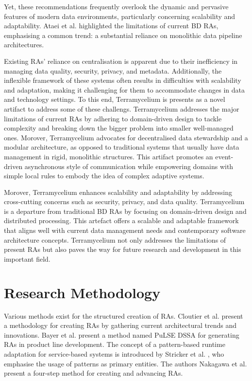 \documentclass[journal]{IEEEtran}
\begin{document}
Yet, these recommendations frequently overlook the dynamic and pervasive features of modern data environments, particularly concerning scalability and adaptability. Ataei et al. \cite{ataei2022state} highlighted the limitations of current BD RAs, emphasising a common trend: a substantial reliance on monolithic data pipeline architectures. 


Existing RAs' reliance on centralisation is apparent due to their inefficiency in managing data quality, security, privacy, and metadata. Additionally, the inflexible framework of these systems often results in difficulties with scalability and adaptation, making it challenging for them to accommodate changes in data and technology settings. To this end, Terramycelium is presents as a novel artifact to address some of these challengs. Terramycelium addresses the major limitations of current RAs by adhering to domain-driven design to tackle complexity and breaking down the bigger problem into smaller well-managed ones. Morover, Terramycelium advocates for decentralised data stewardship and a modular architecture, as opposed to traditional systems that usually have data management in rigid, monolithic structures. This artifact promotes an event-driven asynchronous style of communication while empowering domains with simple local rules to embody the idea of complex adaptive systems. 

Morover, Terramycelium enhances scalability and adaptability by addressing cross-cutting concerns such as security, privacy, and data quality. Terramycelium is a departure from traditional BD RAs by focusing on domain-driven design and distributed processing. This artefact offers a scalable and adaptable framework that aligns well with current data management needs and contemporary software architecture concepts. Terramycelium not only addresses the limitations of present RAs but also paves the way for future research and development in this important field.

\section{Research Methodology}

Various methods exist for the structured creation of RAs. Cloutier et al. \cite{Cloutier2010} present a methodology for creating RAs by gathering current architectural trends and innovations. Bayer et al. \cite{bayer1999pulse} present a method named PuLSE DSSA for generating RAs in product line development. The concept of a pattern-based runtime adaptation for service-based systems is introduced by Stricker et al. \cite{stricker2010creating}, who emphasise the usage of patterns as primary entities. The authors Nakagawa et al. \cite{nakagawa2009towards} present a four-step method for creating and advancing RAs. 
\end{document}
